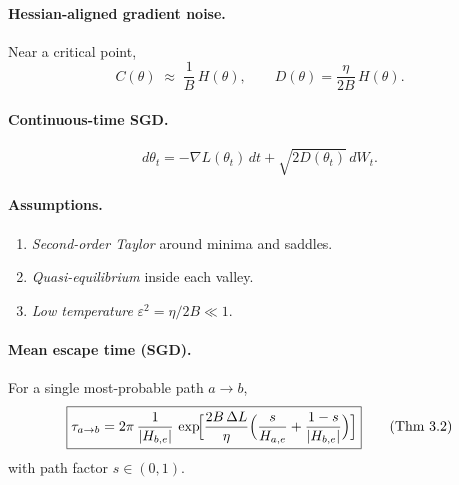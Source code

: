 \documentclass[11pt]{article}
\begin{document}
\paragraph{Hessian-aligned gradient noise.}
Near a critical point,
\begin{equation}
  C(\theta)\;\approx\;\frac1B\,H(\theta),
  \qquad
  D(\theta)=\frac{\eta}{2B}\,H(\theta).
  \tag{6–7}
\end{equation}

\paragraph{Continuous-time SGD.}
\[
  d\theta_t = -\nabla L(\theta_t)\,dt
              +\sqrt{2D(\theta_t)}\,dW_t.
\]
\paragraph{Assumptions.}
\begin{enumerate}
  \item \textit{Second-order Taylor} around minima and saddles.
  \item \textit{Quasi-equilibrium} inside each valley.
  \item \textit{Low temperature} \( \varepsilon^2=\eta/2B\ll 1\).
\end{enumerate}

\paragraph{Mean escape time (SGD).}
For a single most-probable path \(a\!\to\!b\),
\begin{equation}
  \boxed{%
  \tau_{a\to b}
    = 2\pi\,\frac{1}{|H_{b,e}|}\,
      \exp\!\Bigl[
        \frac{2B\,\Delta L}{\eta}
        \Bigl(\frac{s}{H_{a,e}}+\frac{1-s}{|H_{b,e}|}\Bigr)
      \Bigr]}
  \tag{Thm 3.2}
\end{equation}
with path factor \(s\in(0,1)\).
\end{document}
